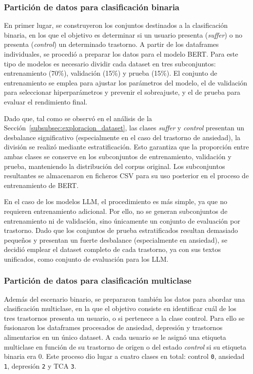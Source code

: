 \subsubsection{Partición de datos para clasificación binaria}

En primer lugar, se construyeron los conjuntos destinados a la clasificación binaria, en los que el objetivo es determinar si un usuario presenta (\textit{suffer}) o no presenta (\textit{control}) un determinado trastorno. A partir de los dataframes individuales, se procedió a preparar los datos para el modelo \ac{BERT}. Para este tipo de modelos es necesario dividir cada dataset en tres subconjuntos: entrenamiento (70\%), validación (15\%) y prueba (15\%). El conjunto de entrenamiento se emplea para ajustar los parámetros del modelo, el de validación para seleccionar hiperparámetros y prevenir el sobreajuste, y el de prueba para evaluar el rendimiento final.

Dado que, tal como se observó en el análisis de la Sección~\ref{subsubsec:exploracion_dataset}, las clases \textit{suffer} y \textit{control} presentan un desbalance significativo (especialmente en el caso del trastorno de ansiedad), la división se realizó mediante estratificación. Esto garantiza que la proporción entre ambas clases se conserve en los subconjuntos de entrenamiento, validación y prueba, manteniendo la distribución del corpus original. Los subconjuntos resultantes se almacenaron en ficheros CSV para su uso posterior en el proceso de entrenamiento de \ac{BERT}.

En el caso de los modelos LLM, el procedimiento es más simple, ya que no requieren entrenamiento adicional. Por ello, no se generan subconjuntos de entrenamiento ni de validación, sino únicamente un conjunto de evaluación por trastorno. Dado que los conjuntos de prueba estratificados resultan demasiado pequeños y presentan un fuerte desbalance (especialmente en ansiedad), se decidió emplear el dataset completo de cada trastorno, ya con sus textos unificados, como conjunto de evaluación para los LLM.

\subsubsection{Partición de datos para clasificación multiclase}

Además del escenario binario, se prepararon también los datos para abordar una clasificación multiclase, en la que el objetivo consiste en identificar cuál de los tres trastornos presenta un usuario, o si pertenece a la clase control. Para ello se fusionaron los dataframes procesados de ansiedad, depresión y trastornos alimentarios en un único dataset. A cada usuario se le asignó una etiqueta multiclase en función de su trastorno de origen o del estado \textit{control} si su etiqueta binaria era 0. Este proceso dio lugar a cuatro clases en total: control \texttt{0}, ansiedad \texttt{1}, depresión \texttt{2} y \ac{TCA} \texttt{3}.

